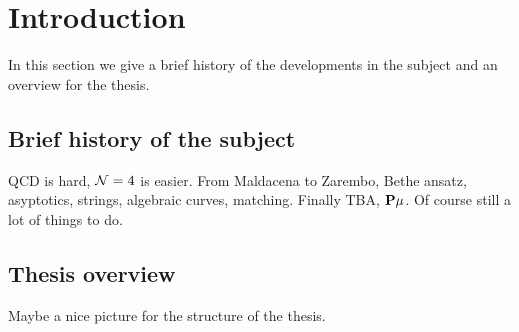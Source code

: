 
\section{Introduction}

In this section we give a brief history of the developments in the subject and an overview for the thesis.

\subsection{Brief history of the subject}

QCD is hard, $\mathcal{N}=4$ is easier. From Maldacena to Zarembo, Bethe ansatz, asyptotics, strings, algebraic curves, matching. Finally TBA, ${\bf P}\mu$. Of course still a lot of things to do.

\subsection{Thesis overview}

Maybe a nice picture for the structure of the thesis.
